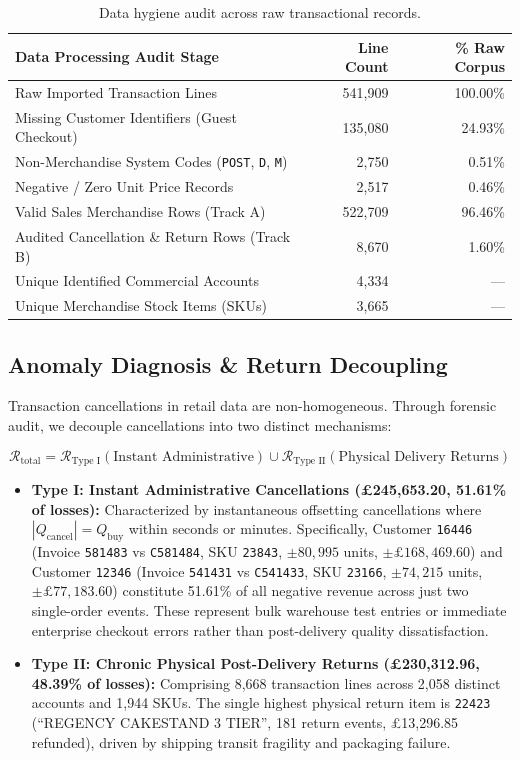 \documentclass[sigconf,nonacm]{acmart}
\begin{document}
\begin{table}[t]
\centering
\small
\caption{Data hygiene audit across raw transactional records.}
\label{tab:hygiene}
\begin{tabular}{lrr}
\toprule
\textbf{Data Processing Audit Stage} & \textbf{Line Count} & \textbf{\% Raw Corpus} \\
\midrule
Raw Imported Transaction Lines & 541,909 & 100.00\% \\
Missing Customer Identifiers (Guest Checkout) & 135,080 & 24.93\% \\
Non-Merchandise System Codes (\texttt{POST}, \texttt{D}, \texttt{M}) & 2,750 & 0.51\% \\
Negative / Zero Unit Price Records & 2,517 & 0.46\% \\
Valid Sales Merchandise Rows (Track A) & 522,709 & 96.46\% \\
Audited Cancellation \& Return Rows (Track B) & 8,670 & 1.60\% \\
Unique Identified Commercial Accounts & 4,334 & --- \\
Unique Merchandise Stock Items (SKUs) & 3,665 & --- \\
\bottomrule
\end{tabular}
\end{table}

\subsection{Anomaly Diagnosis \& Return Decoupling}
Transaction cancellations in retail data are non-homogeneous. Through forensic audit, we decouple cancellations into two distinct mechanisms:

\begin{equation}
\mathcal{R}_{\text{total}} = \mathcal{R}_{\text{Type I}} (\text{Instant Administrative}) \cup \mathcal{R}_{\text{Type II}} (\text{Physical Delivery Returns})
\end{equation}

\begin{itemize}
    \item \textbf{Type I: Instant Administrative Cancellations (£245,653.20, 51.61\% of losses):} Characterized by instantaneous offsetting cancellations where $|Q_{\text{cancel}}| = Q_{\text{buy}}$ within seconds or minutes. Specifically, Customer \texttt{16446} (Invoice \texttt{581483} vs \texttt{C581484}, SKU \texttt{23843}, $\pm 80,995$ units, $\pm £168,469.60$) and Customer \texttt{12346} (Invoice \texttt{541431} vs \texttt{C541433}, SKU \texttt{23166}, $\pm 74,215$ units, $\pm £77,183.60$) constitute 51.61\% of all negative revenue across just two single-order events. These represent bulk warehouse test entries or immediate enterprise checkout errors rather than post-delivery quality dissatisfaction.
    \item \textbf{Type II: Chronic Physical Post-Delivery Returns (£230,312.96, 48.39\% of losses):} Comprising 8,668 transaction lines across 2,058 distinct accounts and 1,944 SKUs. The single highest physical return item is \texttt{22423} (``REGENCY CAKESTAND 3 TIER'', 181 return events, £13,296.85 refunded), driven by shipping transit fragility and packaging failure.
\end{itemize}
\end{document}
